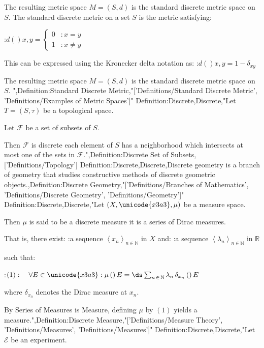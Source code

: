 The resulting metric space $M = \left( S, d \right)$ is the standard discrete metric space on $S$.
The standard discrete metric on a set $S$ is the metric satisfying:

:$d \left(   \right){x, y} = \begin {cases} 0 & : x = y \\ 1 & : x \ne y \end {cases}$


This can be expressed using the Kronecker delta notation as:
:$d \left(   \right){x, y} = 1 - \delta_{x y}$


The resulting metric space $M = \left( S, d \right)$ is the standard discrete metric space on $S$.
",Definition:Standard Discrete Metric,"['Definitions/Standard Discrete Metric', 'Definitions/Examples of Metric Spaces']"
Definition:Discrete,Discrete,"Let $T = \left( S, \tau \right)$ be a topological space.

Let $\mathcal F$ be a set of subsets of $S$.


Then $\mathcal F$ is discrete  each element of $S$ has a neighborhood which intersects at most one of the sets in $\mathcal F$.",Definition:Discrete Set of Subsets,['Definitions/Topology']
Definition:Discrete,Discrete,Discrete geometry is a branch of geometry that studies constructive methods of discrete geometric objects.,Definition:Discrete Geometry,"['Definitions/Branches of Mathematics', 'Definitions/Discrete Geometry', 'Definitions/Geometry']"
Definition:Discrete,Discrete,"Let $\left( X, \unicode{x3a3}, \mu \right)$ be a measure space.


Then $\mu$ is said to be a discrete measure  it is a series of Dirac measures.

That is,  there exist:
:a sequence $\left\langle x_n \right\rangle_{n \mathop \in \mathbb N}$ in $X$
and:
:a sequence $\left\langle \lambda_n \right\rangle_{n \mathop \in \mathbb N}$ in $\mathbb R$

such that:

:$(1):\quad \forall E \in \unicode{x3a3}: \mu \left(   \right)E = \ds \sum_{n \mathop \in \mathbb N} \lambda_n \, \delta_{x_n}  \left(   \right)E$

where $\delta_{x_n}$ denotes the Dirac measure at $x_n$.


By Series of Measures is Measure, defining $\mu$ by $(1)$ yields a measure.",Definition:Discrete Measure,"['Definitions/Measure Theory', 'Definitions/Measures', 'Definitions/Measures']"
Definition:Discrete,Discrete,"Let $\mathcal E$ be an experiment.

